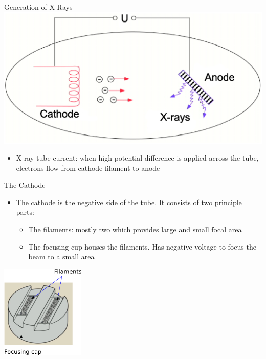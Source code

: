 \begin{frame}{Generation of X-Rays}
    \centering
    \includegraphics[height=0.7\textheight]{images/xraytube_closeup}\\
    \begin{itemize}
        \item X-ray tube current: when high potential difference is applied across the tube, electrons flow from cathode filament to anode
    \end{itemize}
\end{frame}

\begin{frame}{The Cathode}
    \begin{itemize}
        \item The cathode is the negative side of the tube. It consists of two principle parts:
              \begin{itemize}
                  \item The filaments: mostly two which provides large and small focal area
                  \item The focusing cup houses the filaments. Has negative voltage to focus the beam to a small area
              \end{itemize}

    \end{itemize}
    \centering
    \includegraphics[width=0.3\textwidth]{images/cathode}\\

\end{frame}


